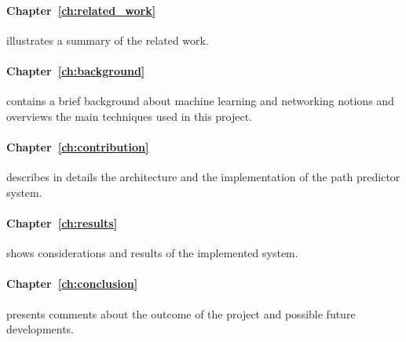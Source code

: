 \paragraph{Chapter~\ref{ch:related_work}} illustrates a summary of the related work. 
\paragraph{Chapter~\ref{ch:background}} contains a brief background about machine learning and networking notions and overviews the main techniques used in this project.
\paragraph{Chapter~\ref{ch:contribution}} describes in details the architecture and the implementation of the path predictor system.
\paragraph{Chapter~\ref{ch:results}} shows considerations and results of the implemented system.
\paragraph{Chapter~\ref{ch:conclusion}} presents comments about the outcome of the project and possible future developments.
\endinput